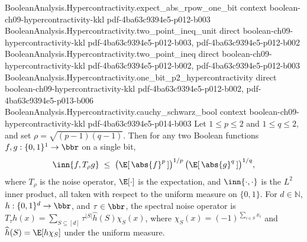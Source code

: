 \begin{theorem}
  {BooleanAnalysis.Hypercontractivity.expect_abs_rpow_one_bit}
  {context}
  {boolean-ch09-hypercontractivity-kkl}
  {pdf-4ba63c9394e5-p012-b003}
\proofstep
  {BooleanAnalysis.Hypercontractivity.two_point_ineq_unit}
  {direct}
  {boolean-ch09-hypercontractivity-kkl}
  {pdf-4ba63c9394e5-p012-b003,
    pdf-4ba63c9394e5-p012-b002}
\proofstep
  {BooleanAnalysis.Hypercontractivity.two_point_ineq}
  {direct}
  {boolean-ch09-hypercontractivity-kkl}
  {pdf-4ba63c9394e5-p012-b002,
    pdf-4ba63c9394e5-p012-b003}
\proofstep
  {BooleanAnalysis.Hypercontractivity.one_bit_p2_hypercontractivity}
  {direct}
  {boolean-ch09-hypercontractivity-kkl}
  {pdf-4ba63c9394e5-p012-b002,
    pdf-4ba63c9394e5-p013-b006}
\proofstep
  {BooleanAnalysis.Hypercontractivity.cauchy_schwarz_bool}
  {context}
  {boolean-ch09-hypercontractivity-kkl}
  {pdf-4ba63c9394e5-p014-b003}
Let $1 \le p \le 2$ and $1 \le q \le 2$, and set $\rho = \sqrt{(p-1)(q-1)}$. Then for
any two Boolean functions $f, g : \{0,1\}^1 \to \bbr$ on a single bit,
\[
\inn{f, T_\rho g} \;\le\;
\bigl(\E[\,\abs{f}^p\,]\bigr)^{1/p}\,\bigl(\E[\,\abs{g}^q\,]\bigr)^{1/q},
\]
where $T_\rho$ is the noise operator, $\E[\cdot]$ is the expectation, and
$\inn{\cdot,\cdot}$ is the $L^2$ inner product, all taken with respect to the uniform
measure on $\{0,1\}$. For $d\in\mathbb N$, $h:\{0,1\}^d\to\bbr$, and $\tau\in\bbr$, the
spectral noise operator is $T_\tau h(x)=\sum_{S\subseteq[d]}\tau^{|S|}\widehat
h(S)\chi_S(x)$, where $\chi_S(x)=(-1)^{\sum_{i\in S}x_i}$ and $\widehat
h(S)=\E[h\chi_S]$ under the uniform measure.
\end{theorem}

